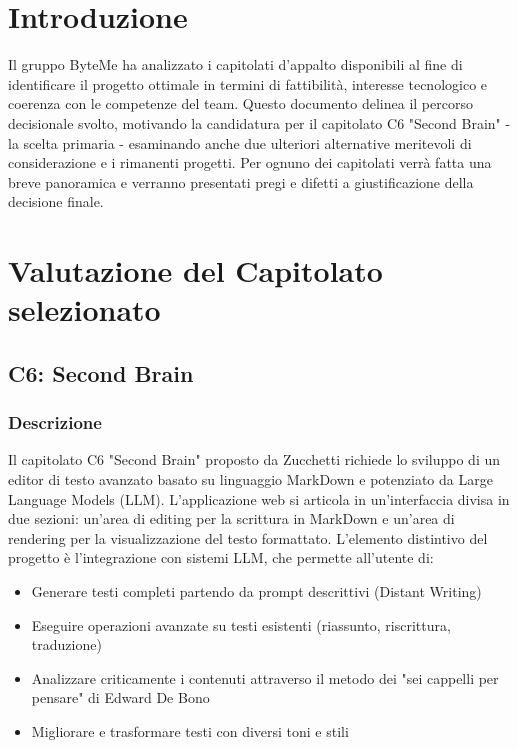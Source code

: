 \documentclass[11pt,a4paper]{article}
\begin{document}
\newpage

\tableofcontents
\thispagestyle{empty}
\newpage

\setcounter{page}{1}

\section{Introduzione}
Il gruppo ByteMe ha analizzato i capitolati d'appalto disponibili al fine di identificare il progetto ottimale in termini di fattibilità, interesse tecnologico e coerenza con le competenze del team. Questo documento delinea il percorso decisionale svolto, motivando la candidatura per il capitolato C6 "Second Brain" - la scelta primaria - esaminando anche due ulteriori alternative meritevoli di considerazione e i rimanenti progetti. Per ognuno dei capitolati verrà fatta una breve panoramica e verranno presentati pregi e difetti a giustificazione della decisione finale.

\newpage
\section{Valutazione del Capitolato selezionato}

\subsection{C6: Second Brain}

\subsubsection{Descrizione}
Il capitolato C6 "Second Brain" proposto da Zucchetti richiede lo sviluppo di un editor di testo avanzato basato su linguaggio MarkDown e potenziato da Large Language Models (LLM). L'applicazione web si articola in un'interfaccia divisa in due sezioni: un'area di editing per la scrittura in MarkDown e un'area di rendering per la visualizzazione del testo formattato.
L'elemento distintivo del progetto è l'integrazione con sistemi LLM, che permette all'utente di:
\begin{itemize}
    \item Generare testi completi partendo da prompt descrittivi (Distant Writing)
    \item Eseguire operazioni avanzate su testi esistenti (riassunto, riscrittura, traduzione)
    \item Analizzare criticamente i contenuti attraverso il metodo dei "sei cappelli per pensare" di Edward De Bono
    \item Migliorare e trasformare testi con diversi toni e stili
\end{itemize}
\end{document}
